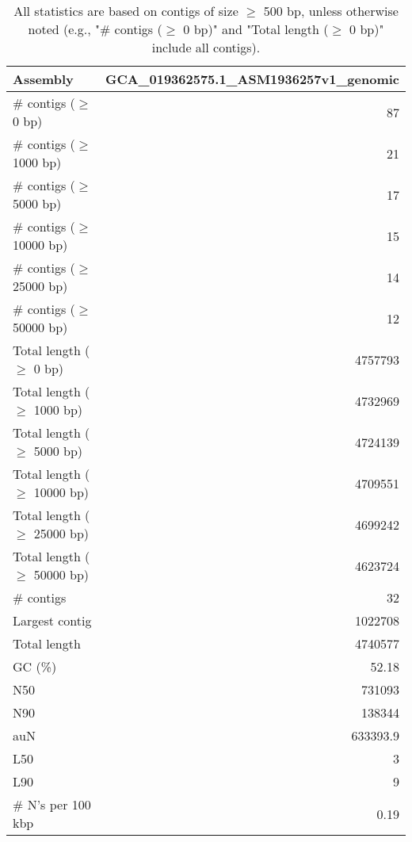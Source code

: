 \documentclass[12pt,a4paper]{article}
\begin{document}
\begin{table}[ht]
\begin{center}
\caption{All statistics are based on contigs of size $\geq$ 500 bp, unless otherwise noted (e.g., "\# contigs ($\geq$ 0 bp)" and "Total length ($\geq$ 0 bp)" include all contigs).}
\begin{tabular}{|l*{1}{|r}|}
\hline
Assembly & GCA\_019362575.1\_ASM1936257v1\_genomic \\ \hline
\# contigs ($\geq$ 0 bp) & 87 \\ \hline
\# contigs ($\geq$ 1000 bp) & 21 \\ \hline
\# contigs ($\geq$ 5000 bp) & 17 \\ \hline
\# contigs ($\geq$ 10000 bp) & 15 \\ \hline
\# contigs ($\geq$ 25000 bp) & 14 \\ \hline
\# contigs ($\geq$ 50000 bp) & 12 \\ \hline
Total length ($\geq$ 0 bp) & 4757793 \\ \hline
Total length ($\geq$ 1000 bp) & 4732969 \\ \hline
Total length ($\geq$ 5000 bp) & 4724139 \\ \hline
Total length ($\geq$ 10000 bp) & 4709551 \\ \hline
Total length ($\geq$ 25000 bp) & 4699242 \\ \hline
Total length ($\geq$ 50000 bp) & 4623724 \\ \hline
\# contigs & 32 \\ \hline
Largest contig & 1022708 \\ \hline
Total length & 4740577 \\ \hline
GC (\%) & 52.18 \\ \hline
N50 & 731093 \\ \hline
N90 & 138344 \\ \hline
auN & 633393.9 \\ \hline
L50 & 3 \\ \hline
L90 & 9 \\ \hline
\# N's per 100 kbp & 0.19 \\ \hline
\end{tabular}
\end{center}
\end{table}
\end{document}
